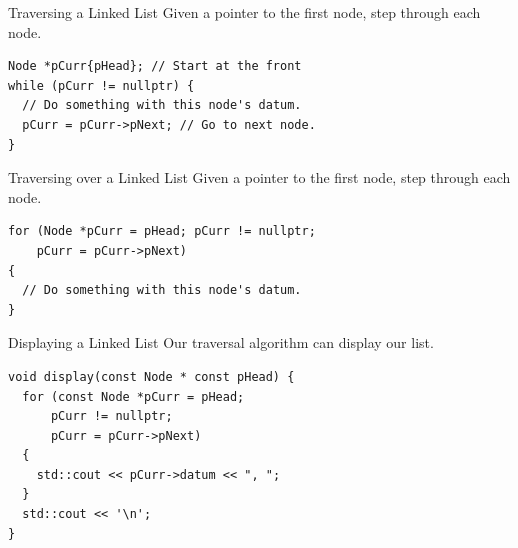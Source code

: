 \documentclass[14pt,aspectratio=1610, hyperref={pdfpagelayout=SinglePage}]{beamer}
\begin{document}
\begin{frame}[fragile]{Traversing a Linked List}
Given a pointer to the first node, step through each node.

\begin{lstlisting}
Node *pCurr{pHead}; // Start at the front
while (pCurr != nullptr) {
  // Do something with this node's datum.
  pCurr = pCurr->pNext; // Go to next node.
}
\end{lstlisting}


\end{frame}


\begin{frame}[fragile]{Traversing over a Linked List}
Given a pointer to the first node, step through each node.

\begin{lstlisting}
for (Node *pCurr = pHead; pCurr != nullptr;
    pCurr = pCurr->pNext)
{
  // Do something with this node's datum.
}
\end{lstlisting}

\end{frame}


\begin{frame}[fragile]{Displaying a Linked List}
Our traversal algorithm can display our list.

\begin{lstlisting}
void display(const Node * const pHead) {
  for (const Node *pCurr = pHead; 
      pCurr != nullptr;
      pCurr = pCurr->pNext)
  {
    std::cout << pCurr->datum << ", ";
  }
  std::cout << '\n';
}
\end{lstlisting}
\end{frame}
\end{document}
